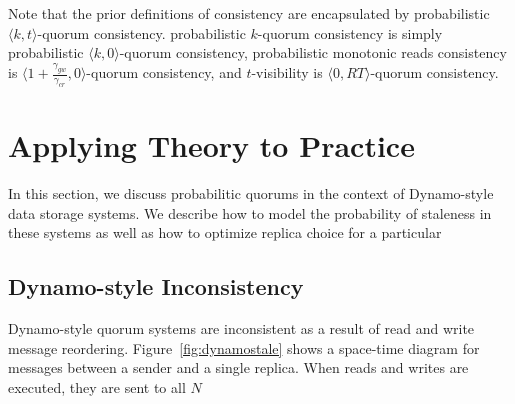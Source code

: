 \documentclass{vldb}
\begin{document}
Note that the prior definitions of consistency are encapsulated by
probabilistic $\langle k, t \rangle$-quorum consistency. probabilistic
$k$-quorum consistency is simply probabilistic $\langle k, 0
\rangle$-quorum consistency, probabilistic monotonic reads consistency
is $\langle 1+\frac{\gamma_{gw}}{\gamma_{cr}}, 0 \rangle$-quorum
consistency, and $t$-visibility is $\langle 0, RT \rangle$-quorum
consistency.

\section{Applying Theory to Practice}
\label{sec:optimize}

In this section, we discuss probabilitic quorums in the context of
Dynamo-style data storage systems.  We describe how to model the
probability of staleness in these systems as well as how to optimize
replica choice for a particular

\subsection{Dynamo-style Inconsistency}

Dynamo-style quorum systems are inconsistent as a result of read and
write message reordering.  Figure~\ref{fig:dynamostale} shows a
space-time diagram for messages between a sender and a single replica.
When reads and writes are executed, they are sent to all $N$
\end{document}
